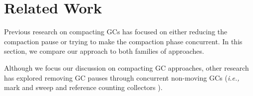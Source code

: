\documentclass[sigplan,10pt,screen]{acmart}\settopmatter{printfolios=true,printccs=true,printacmref=true}
\def\OpenSmalltalkVM{OpenSmalltalk-VM\xspace}
\def\ie{\emph{i.e., }}
\begin{document}
%
%

\section{Related Work}
\label{sec:relWork}

Previous research on compacting GCs has focused on either reducing the compaction pause or trying to make the compaction phase concurrent. In this section, we compare our approach to both families of approaches. 

Although we focus our discussion on compacting GC approaches, other research has explored removing GC pauses through concurrent non-moving GCs (\ie mark and sweep and reference counting collectors \cite{ConcNonMovingGC,ConcNonMovingGC2,CMSGC,ConcRefCount}). 
\end{document}
